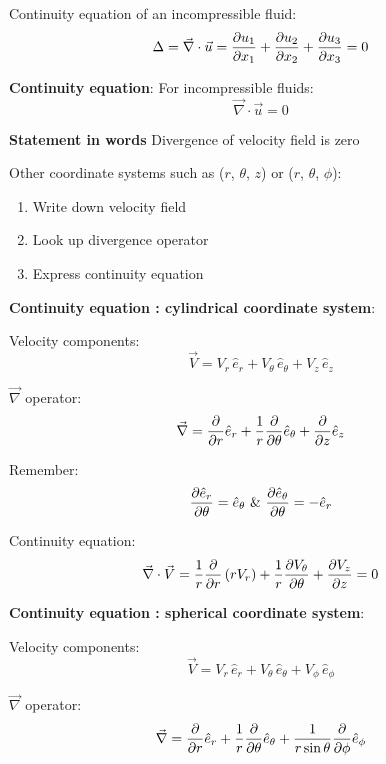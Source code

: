 Continuity equation of an incompressible fluid:
$$ \Delta = \vec{\nabla} \cdot \vec{u} = {\partial u_1 \over \partial x_1} + {\partial u_2 \over \partial x_2} + {\partial u_3 \over \partial x_3} = 0 $$


{\bf Continuity equation}: 
For incompressible fluids:
$$\vec{\nabla} \cdot \vec{u} = 0$$

{\bf Statement in words}
Divergence of velocity field is zero

Other coordinate systems such as ($r$, $\theta$, $z$) or ($r$, $\theta$, $\phi$):
\begin{enumerate}
\item Write down velocity field 
\item Look up divergence operator 
\item Express continuity equation
\end{enumerate}



{\bf Continuity equation : cylindrical coordinate system}:

Velocity components:
$$ \vec{V} = V_r \, \hat{e}_r + V_\theta \, \hat{e}_\theta + V_z \, \hat{e}_z $$

$\vec{\nabla}$ operator:
$$ \vec{\nabla} = {\partial \over \partial r} \hat{e}_r + {1 \over r} {\partial \over \partial \theta} \hat{e}_\theta + {\partial \over \partial z} \hat{e}_z $$

Remember:
$$ {\partial \hat{e}_r \over \partial \theta} = \hat{e}_\theta \, \, \& \, \, {\partial \hat{e}_\theta \over \partial \theta} = -\hat{e}_r$$

Continuity equation:
$$ \vec{\nabla} \cdot \vec{V} = {1 \over r} {\partial \over \partial r} \left( r V_r \right) + {1 \over r} {\partial V_\theta \over \partial \theta} + {\partial V_z \over \partial z} = 0 $$



{\bf Continuity equation : spherical coordinate system}:

Velocity components:
$$ \vec{V} = V_r \, \hat{e}_r + V_\theta \, \hat{e}_\theta + V_\phi \, \hat{e}_\phi $$

$\vec{\nabla}$ operator:
$$ \vec{\nabla} = {\partial \over \partial r} \hat{e}_r + {1 \over r} {\partial \over \partial \theta} \hat{e}_\theta + {1 \over r\sin\theta}{\partial \over \partial \phi} \hat{e}_\phi $$

